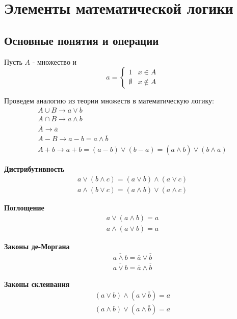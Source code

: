 \chapter{Элементы математической логики}
\section{Основные понятия и операции}
Пусть $A$ - множество и 
\begin{equation}
    a = 
    \begin{cases}
        1 &\text{$x \in A$}\\
        \emptyset &\text{$x \notin A$}
    \end{cases}
\end{equation}

Проведем аналогию из теории множеств в математическую логику:
\begin{gather}
    A \cup B \rightarrow a \lor b \\
    A \cap B \rightarrow a \land b \\
    \overline A \rightarrow \overline a \\
    A - B \rightarrow a - b = a \land \overline b \\
    A + b \rightarrow a + b = (a - b) \lor (b - a) = (a \land \overline b) \lor (b \land \overline a)
\end{gather}

\textbf{Дистрибутивность}
\begin{gather}
    a \lor (b \land c) = (a \lor b) \land (a \lor c) \\
    a \land (b \lor c) = (a \land b) \lor (a \land c)
\end{gather}

\textbf{Поглощение}
\begin{gather}
    a \lor (a \land b) = a \\
    a \land (a \lor b) = a
\end{gather}

\textbf{Законы де-Моргана}
\begin{gather}
    \overline{a \land b} = \overline a \lor \overline b \\
    \overline{a \lor b} = \overline a \land \overline b
\end{gather}

\textbf{Законы склеивания}
\begin{gather}
    (a \lor b) \land (a \lor \overline b) = a \\
    (a \land b) \lor (a \land \overline b) = a
\end{gather}

